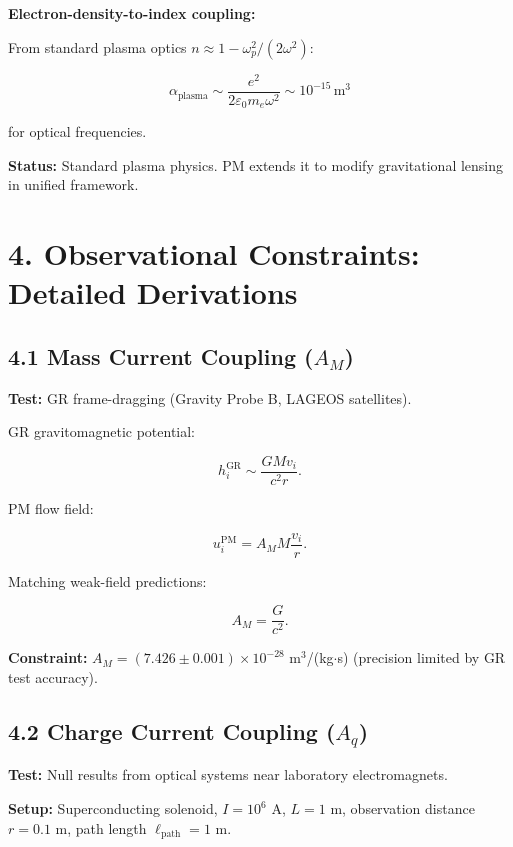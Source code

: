 \documentclass{article}
\begin{document}
\textbf{Electron-density-to-index coupling:}

From standard plasma optics $n \approx 1 - \omega_p^2/(2\omega^2)$:



\[
\alpha_{\text{plasma}}
\sim \frac{e^2}{2\varepsilon_0 m_e \omega^2}
\sim 10^{-15}\,\text{m}^3
\]



for optical frequencies.

\textbf{Status:} Standard plasma physics. PM extends it to modify gravitational
lensing in unified framework.

\section*{4. Observational Constraints: Detailed Derivations}

\subsection*{4.1 Mass Current Coupling ($A_M$)}

\textbf{Test:} GR frame-dragging (Gravity Probe B, LAGEOS satellites).

GR gravitomagnetic potential:



\[
h_i^{\text{GR}} \sim \frac{G M v_i}{c^2 r}.
\]



PM flow field:



\[
u_i^{\text{PM}} = A_M M \frac{v_i}{r}.
\]



Matching weak-field predictions:



\[
A_M = \frac{G}{c^2}.
\]



\textbf{Constraint:} $A_M = (7.426 \pm 0.001) \times 10^{-28}$ m$^3$/(kg$\cdot$s)
(precision limited by GR test accuracy).

\subsection*{4.2 Charge Current Coupling ($A_q$)}

\textbf{Test:} Null results from optical systems near laboratory electromagnets.

\textbf{Setup:} Superconducting solenoid, $I = 10^6$ A, $L = 1$ m, observation
distance $r = 0.1$ m, path length $\ell_{\text{path}} = 1$ m.
\end{document}
